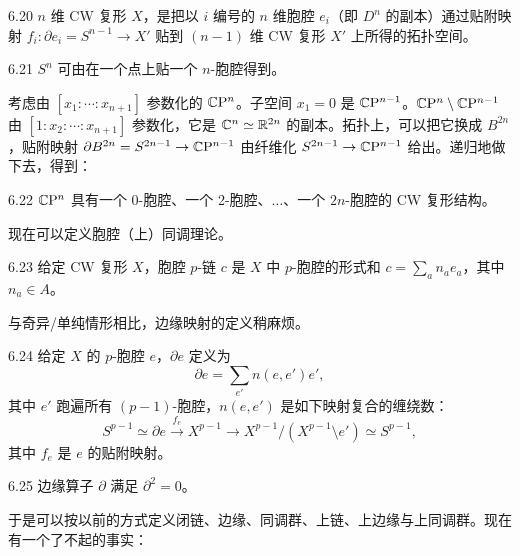 \begin{definition}{6.20}
  $n$ 维 CW 复形 $X$，是把以 $i$ 编号的 $n$ 维胞腔 $e_i$（即 $D^n$ 的副本）通过贴附映射 $f_i:\partial e_i=S^{n-1}\to X'$ 贴到 $(n-1)$ 维 CW 复形 $X'$ 上所得的拓扑空间。
\end{definition}

\begin{example}{6.21}
  $S^n$ 可由在一个点上贴一个 $n$-胞腔得到。
\end{example}

考虑由 $[x_1:\cdots:x_{n+1}]$ 参数化的 $\mathbb{C}\mathrm{P}^n$。子空间 $x_1=0$ 是 $\mathbb{C}\mathrm{P}^{n-1}$。$\mathbb{C}\mathrm{P}^n\setminus\mathbb{C}\mathrm{P}^{n-1}$ 由 $[1:x_2:\cdots:x_{n+1}]$ 参数化，它是 $\mathbb{C}^n\simeq\mathbb{R}^{2n}$ 的副本。拓扑上，可以把它换成 $B^{2n}$，贴附映射 $\partial B^{2n}=S^{2n-1}\to\mathbb{C}\mathrm{P}^{n-1}$ 由纤维化 $S^{2n-1}\to\mathbb{C}\mathrm{P}^{n-1}$ 给出。递归地做下去，得到：

\begin{example}{6.22}
  $\mathbb{C}\mathrm{P}^n$ 具有一个 0-胞腔、一个 2-胞腔、$\dots$、一个 $2n$-胞腔的 CW 复形结构。
\end{example}

现在可以定义胞腔（上）同调理论。

\begin{definition}{6.23}
  给定 CW 复形 $X$，胞腔 $p$-链 $c$ 是 $X$ 中 $p$-胞腔的形式和 $c=\sum_an_ae_a$，其中 $n_a\in A$。
\end{definition}

与奇异/单纯情形相比，边缘映射的定义稍麻烦。

\begin{definition}{6.24}
  给定 $X$ 的 $p$-胞腔 $e$，$\partial e$ 定义为
  \begin{equation}
    \partial e=\sum_{e'}n(e,e')e',
    \tag{6.12}
  \end{equation}
  其中 $e'$ 跑遍所有 $(p-1)$-胞腔，$n(e,e')$ 是如下映射复合的缠绕数：
  \begin{equation}
    S^{p-1}\simeq\partial e\xrightarrow{\ f_e\ }X^{p-1}
    \to X^{p-1}/(X^{p-1}\setminus e')\simeq S^{p-1},
    \tag{6.13}
  \end{equation}
  其中 $f_e$ 是 $e$ 的贴附映射。
\end{definition}

\begin{proposition}{6.25}
  边缘算子 $\partial$ 满足 $\partial^2=0$。
\end{proposition}

于是可以按以前的方式定义闭链、边缘、同调群、上链、上边缘与上同调群。现在有一个了不起的事实：


